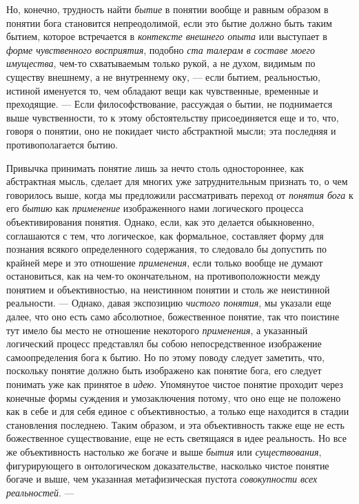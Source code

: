 \documentclass[twoside]{article}
\begin{document}
{{{{{{Но, конечно, трудность найти
{\em бытие} в понятии
вообще и равным образом в понятии бога становится непреодолимой, если это
бытие должно быть таким бытием, которое встречается в
{\em контексте внешнего опыта}
или выступает в {\em форме
чувственного восприятия}, подобно
{\em ста талерам в составе моего
имущества}, чем-то схватываемым только рукой, а не духом,
видимым по существу внешнему, а не внутреннему оку, — если
бытием, реальностью, истиной именуется то, чем обладают вещи как
чувственные, временные и преходящие. — Если
философствование, рассуждая о бытии, не поднимается выше чувственности, то
к этому обстоятельству присоединяется еще и то, что, говоря о понятии, оно
не покидает чисто абстрактной мысли; эта последняя и противополагается
бытию.

Привычка принимать понятие лишь за нечто столь одностороннее,
как абстрактная мысль, сделает для многих уже затруднительным признать то,
о чем говорилось выше, когда мы предложили рассматривать переход от
{\em понятия бога} к его
{\em бытию} как
{\em применение}
изображенного нами логического процесса объективирования
понятия. Однако, если, как это делается обыкновенно, соглашаются с тем, что
логическое, как формальное, составляет форму для познания всякого
определенного содержания, то следовало бы допустить по крайней мере и это
отношение {\em применения},
если только вообще не думают остановиться, как на чем-то
окончательном, на противоположности между понятием и объективностью, на
неистинном понятии и столь же неистинной реальности. —
Однако, давая экспозицию
{\em чистого понятия}, мы
указали еще далее, что оно есть само абсолютное, божественное понятие, так
что поистине тут имело бы место не отношение некоторого
{\em применения}, а
указанный логический процесс представлял бы собою непосредственное
изображение самоопределения бога к бытию. Но по этому поводу следует
заметить, что, поскольку понятие должно быть изображено как понятие бога,
его следует понимать уже как принятое в
{\em идею}. Упомянутое
чистое понятие проходит через конечные формы суждения и
умозаключения потому, что оно еще не положено как в себе и для себя единое
с объективностью, а только еще находится в стадии становления последнею.
Таким образом, и эта объективность также еще не есть божественное
существование, еще не есть светящаяся в идее реальность. Но все же
объективность настолько же богаче и выше
{\em бытия} или
{\em существования},
фигурирующего в онтологическом доказательстве, насколько
чистое понятие богаче и выше, чем указанная метафизическая пустота
{\em совокупности всех реальностей}. —
}}}}}}
\end{document}
